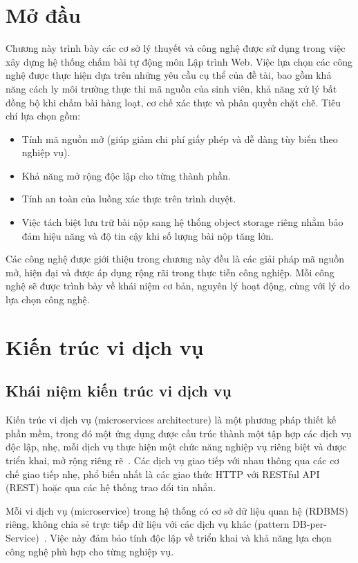 \documentclass[../BTL.tex]{subfiles}
\begin{document}
\section{Mở đầu}
\label{section:1.1}

Chương này trình bày các cơ sở lý thuyết và công nghệ được sử dụng trong việc xây dựng hệ thống chấm bài tự động môn Lập trình Web. Việc lựa chọn các công nghệ được thực hiện dựa trên những yêu cầu cụ thể của đề tài, bao gồm khả năng cách ly môi trường thực thi mã nguồn của sinh viên, khả năng xử lý bất đồng bộ khi chấm bài hàng loạt, cơ chế xác thực và phân quyền chặt chẽ. Tiêu chí lựa chọn gồm:
\begin{itemize}
    \item Tính mã nguồn mở (giúp giảm chi phí giấy phép và dễ dàng tùy biến theo nghiệp vụ).
    \item Khả năng mở rộng độc lập cho từng thành phần.
    \item Tính an toàn của luồng xác thực trên trình duyệt.
    \item Việc tách biệt lưu trữ bài nộp sang hệ thống object storage riêng nhằm bảo đảm hiệu năng và độ tin cậy khi số lượng bài nộp tăng lớn.
\end{itemize}
Các công nghệ được giới thiệu trong chương này đều là các giải pháp mã nguồn mở, hiện đại và được áp dụng rộng rãi trong thực tiễn công nghiệp. Mỗi công nghệ sẽ được trình bày về khái niệm cơ bản, nguyên lý hoạt động, cùng với lý do lựa chọn công nghệ.

\section{Kiến trúc vi dịch vụ}
\label{section:1.2}

\subsection{Khái niệm kiến trúc vi dịch vụ}
\label{section:1.2.1}

Kiến trúc vi dịch vụ (microservices architecture) là một phương pháp thiết kế phần mềm, trong đó một ứng dụng được cấu trúc thành một tập hợp các dịch vụ độc lập, nhẹ, mỗi dịch vụ thực hiện một chức năng nghiệp vụ riêng biệt và được triển khai, mở rộng riêng rẽ~\cite{newman2021building}. Các dịch vụ giao tiếp với nhau thông qua các cơ chế giao tiếp nhẹ, phổ biến nhất là các giao thức HTTP với RESTful API (REST) hoặc qua các hệ thống trao đổi tin nhắn.

Mỗi vi dịch vụ (microservice) trong hệ thống có cơ sở dữ liệu quan hệ (RDBMS) riêng, không chia sẻ trực tiếp dữ liệu với các dịch vụ khác (pattern DB-per-Service)~\cite{newman2021building}. Việc này đảm bảo tính độc lập về triển khai và khả năng lựa chọn công nghệ phù hợp cho từng nghiệp vụ.
\end{document}
